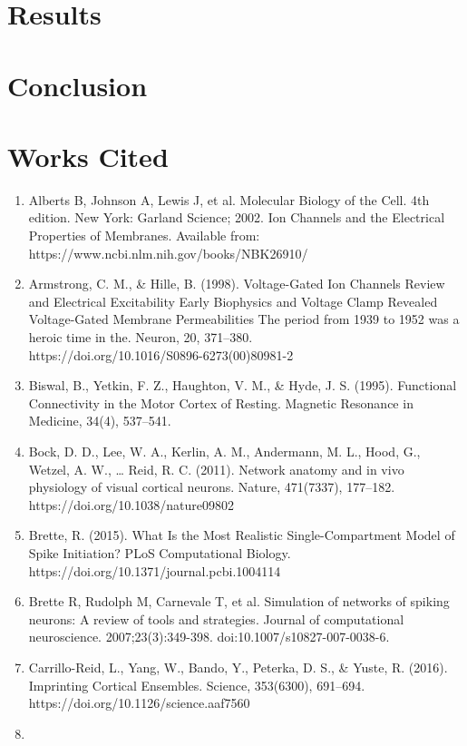 \documentclass[11pt]{article}
\begin{document}
\section{Results}

\section{Conclusion}

\section{Works Cited}


\begin{enumerate}
\item Alberts B, Johnson A, Lewis J, et al. Molecular Biology of the Cell. 4th edition. New York: Garland Science; 2002. Ion Channels and the Electrical Properties of Membranes. Available from: https://www.ncbi.nlm.nih.gov/books/NBK26910/
\item Armstrong, C. M., \& Hille, B. (1998). Voltage-Gated Ion Channels Review and Electrical Excitability Early Biophysics and Voltage Clamp Revealed Voltage-Gated Membrane Permeabilities The period from 1939 to 1952 was a heroic time in the. Neuron, 20, 371–380.\\ https://doi.org/10.1016/S0896-6273(00)80981-2
\item Biswal, B., Yetkin, F. Z., Haughton, V. M., \& Hyde, J. S. (1995). Functional Connectivity in the Motor Cortex of Resting. Magnetic Resonance in Medicine, 34(4), 537–541.
\item Bock, D. D., Lee, W. A., Kerlin, A. M., Andermann, M. L., Hood, G., Wetzel, A. W., … Reid, R. C. (2011). Network anatomy and in vivo physiology of visual cortical neurons. Nature, 471(7337), 177–182. https://doi.org/10.1038/nature09802
\item Brette, R. (2015). What Is the Most Realistic Single-Compartment Model of Spike Initiation? PLoS Computational Biology. https://doi.org/10.1371/journal.pcbi.1004114
\item Brette R, Rudolph M, Carnevale T, et al. Simulation of networks of spiking neurons: A review of tools and strategies. Journal of computational neuroscience. 2007;23(3):349-398. doi:10.1007/s10827-007-0038-6.
\item Carrillo-Reid, L., Yang, W., Bando, Y., Peterka, D. S., \& Yuste, R. (2016). Imprinting Cortical Ensembles. Science, 353(6300), 691–694. https://doi.org/10.1126/science.aaf7560
\item 

\end{enumerate}
\end{document}

